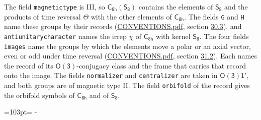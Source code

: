 \documentclass[10pt,a4paper]{article}
\newcommand{\needspace}[1]{\par\penalty-100\begingroup\dimen0=#1\relax\dimen2=\pagegoal
  \advance\dimen2-\pagetotal\ifdim\dimen0>\dimen2\relax\ifdim\dimen2>0pt\vfil\break\fi\fi
  \endgroup}
\numberwithin{equation}{section}
\newcommand{\grp}[1]{\mathsf{#1}}
\begin{document}
The field \texttt{magnetictype} is III, so $\grp{C_{8h}}(\grp{S_{8}})$ contains the elements of $\grp{S_{8}}$ and the products of time reversal $\varTheta$ with the other elements of $\grp{C_{8h}}$. The fields \texttt{G} and \texttt{H} name these groups by their records (\href{../../CONVENTIONS.pdf}{CONVENTIONS.pdf}, section \href{../../CONVENTIONS.pdf\#conv.30.3}{30.3}), and \texttt{antiunitarycharacter} names the irrep $\chi$ of $\grp{C_{8h}}$ with kernel $\grp{S_{8}}$. The four fields \texttt{images} name the groups by which the elements move a polar or an axial vector, even or odd under time reversal (\href{../../CONVENTIONS.pdf}{CONVENTIONS.pdf}, section \href{../../CONVENTIONS.pdf\#conv.31.2}{31.2}). Each names the record of its $\grp{O(3)}$-conjugacy class and the frame that carries that record onto the image. The fields \texttt{normalizer} and \texttt{centralizer} are taken in $\grp{O(3)1'}$, and both groups are of magnetic type II. The field \texttt{orbifold} of the record gives the orbifold symbols of $\grp{C_{8h}}$ and of $\grp{S_{8}}$.
\needspace{103pt}
\end{document}
